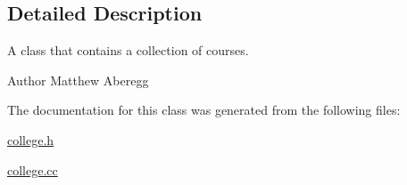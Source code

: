 \subsection{Detailed Description}
A class that contains a collection of courses. 

\begin{DoxyAuthor}{Author}
Matthew Aberegg 
\end{DoxyAuthor}


The documentation for this class was generated from the following files\+:\begin{DoxyCompactItemize}
\item 
\hyperlink{college_8h}{college.\+h}\item 
\hyperlink{college_8cc}{college.\+cc}\end{DoxyCompactItemize}
